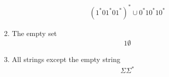 \begin{enumerate}
\begin{enumerate}
                    \begin{align*}
                        (1^*01^*01^*)^* \cup 0^*10^*10^*
                    \end{align*}
              \item The empty set
                    \begin{align*}
                        1\emptyset
                    \end{align*}
              \item All strings except the empty string
                    \begin{align*}
                        \Sigma\Sigma^\ast
                    \end{align*}
                    
          \end{enumerate}
\end{enumerate}
